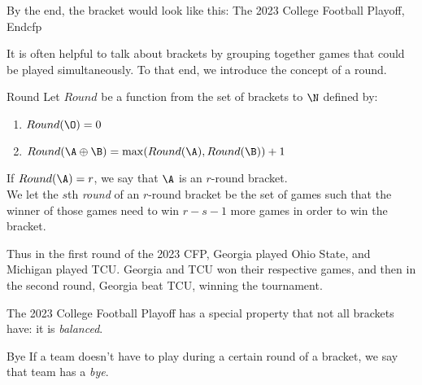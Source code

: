 {By the end, the bracket would look like this:
 {The 2023 College Football Playoff, End}{cfp}



It is often helpful to talk about brackets by grouping together games that could be played simultaneously. To that end, we introduce the concept of a round.

\begin{definition}{Round}{}
    Let $Round$ be a function from the set of brackets to $\N$ defined by:
    \begin{enumerate}
        \item $Round(\O) = 0$
        \item $Round(\A \oplus \B) = \max(Round(\A), Round(\B)) + 1$
    \end{enumerate}
    If $Round(\A) = r$, we say that $\A$ is an $r$-round bracket.\\

    We let the $s$th \textit{round} of an $r$-round bracket be the set of games such that the winner of those games need to win $r - s - 1$ more games in order to win the bracket.
\end{definition}

Thus in the first round of the 2023 CFP, Georgia played Ohio State, and Michigan played TCU. Georgia and TCU won their respective games, and then in the second round, Georgia beat TCU, winning the tournament.

The 2023 College Football Playoff has a special property that not all brackets have: it is \textit{balanced}.
\begin{definition}{Bye}{}
    If a team doesn't have to play during a certain round of a bracket, we say that team has a \textit{bye}.
\end{definition}

}
